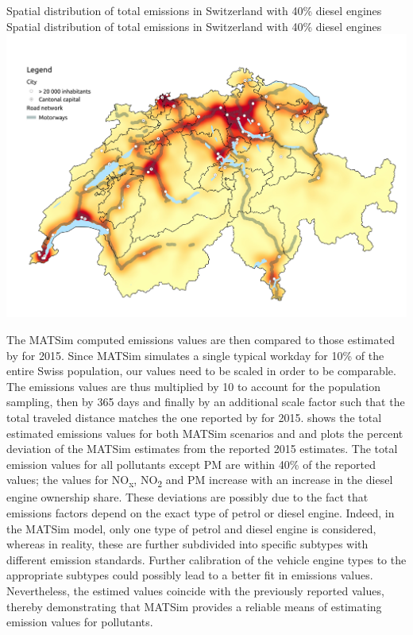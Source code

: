 \createfigure%
{Spatial distribution of total emissions in Switzerland with 40\% diesel engines}%
{Spatial distribution of total emissions in Switzerland with 40\% diesel engines}%
{\label{fig:spatialEmissions}}%
{\includegraphics[width=1.0\textwidth, angle=0]{figures/total_emissions_heatmap.pdf}}%
{}

The MATSim computed emissions values are then compared to those estimated by \citet{foen2010pollutants} for 2015.
Since MATSim simulates a single typical workday for 10\% of the entire Swiss population, our values need to be scaled in order to be comparable.
The emissions values are thus multiplied by 10 to account for the population sampling, then by 365 days and finally by an additional scale factor such that the total traveled distance matches the one reported by \citet{foen2010pollutants} for 2015.
 shows the total estimated emissions values for both MATSim scenarios and \citet{foen2010pollutants} and  plots the percent deviation of the MATSim estimates from the reported 2015 estimates.
The total emission values for all pollutants except PM are within 40\% of the reported values; the values for NO\textsubscript{x}, NO\textsubscript{2} and PM increase with an increase in the diesel engine ownership share.
These deviations are possibly due to the fact that emissions factors depend on the exact type of petrol or diesel engine.
Indeed, in the MATSim model, only one type of petrol and diesel engine is considered, whereas in reality, these are further subdivided into specific subtypes with different emission standards.
Further calibration of the vehicle engine types to the appropriate subtypes could possibly lead to a better fit in emissions values.
Nevertheless, the estimed values coincide with the previously reported values, thereby demonstrating that MATSim provides a reliable means of estimating emission values for pollutants.


